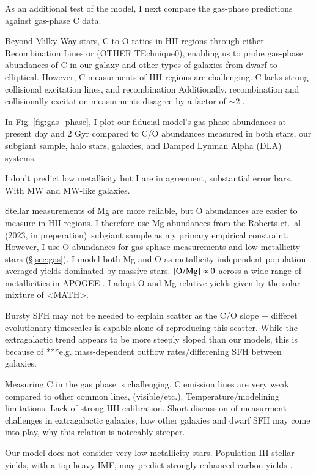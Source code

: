 \documentclass[12pt,oneside]{report}
\newcommand{\citetjack}{Roberts et.\ al (2023, in preperation)}
\begin{document}
As an additional test of the model, I next compare the gas-phase predictions against gas-phase C data. 

Beyond Milky Way stars, C to O ratios in
HII-regions through either Recombination Lines or (OTHER TEchnique0), enabling
us to probe gas-phase abundances of C in our galaxy and other types of
galaxies from dwarf to elliptical. 
However, C measurments of HII regions are challenging. C lacks strong collisional excitation lines, and recombination
Additionally, recombination and collisionally excitation measurments disagree by a factor of $\sim 2$ \cite{GR07}.


In Fig. \ref{fig:gas_phase}, I plot our fiducial model's gas phase abundances
at present day and 2 Gyr compared to C/O
abundances measured in both stars, our subgiant sample, halo stars, galaxies,
and Damped Lynman Alpha (DLA) systems. 

I don't predict low metallicity but I are in agreement, substantial error bars.
With MW and MW-like galaxies.


Stellar measurements of Mg are more reliable, but O abundances are easier to measure in HII regions.  I therefore use Mg abundances from the \citetjack~subgiant sample as my primary empirical constraint. However, I use O abundances for gas-sphase measurements and low-metallicity stars (\S \ref{sec:gas}). I model both Mg and O as metallicity-independent population-averaged yields dominated by massive stars. ${\rm [O/Mg]}\approx 0$ across a wide range of metallicities in APOGEE \citep{Weinberg+19, Weinberg+22}. 
I adopt O and Mg relative yields given by the solar mixture of \cite{asplund+09} <MATH>.



Bursty SFH may not be needed to explain scatter as the C/O slope + differet evolutionary timescales is capable alone of reproducing this scatter.
While the extragalactic trend appears to be more steeply sloped than our models, this is because of ***e.g. mass-dependent outflow rates/differening SFH between galaxies. 

Measuring C in the gas phase is challenging. C emission lines are
very weak compared to other common lines, (visible/etc.).
Temperature/modelining limitations. Lack of strong HII calibration. 
Short discussion of measurment challenges in extragalactic galaxies, how other galaxies and dwarf SFH may come into play, why this relation is notecably steeper.

Our model does not consider very-low metallicity stars. Population III stellar yields, with a top-heavy IMF, may predict strongly enhanced carbon yields \cite[e.g.]{hirschi07}.
\end{document}
